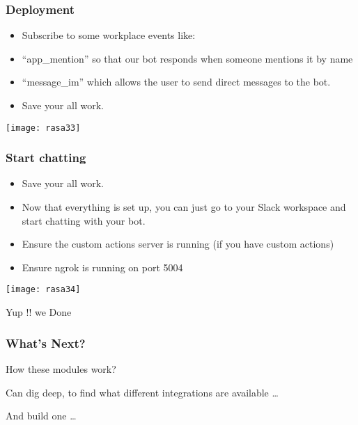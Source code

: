 \begin{frame}[fragile]\frametitle{Deployment}
\begin{itemize}
\item Subscribe to some workplace events like:
\item ``app\_mention'' so that our bot responds when someone mentions it by name
\item ``message\_im'' which allows the user to send direct messages to the bot.
\item Save your all work.
\end{itemize}

\begin{center}
\texttt{[image: rasa33]}
\end{center}
\end{frame}

\begin{frame}[fragile]\frametitle{Start chatting }
\begin{itemize}
\item Save your all work.
\item Now that everything is set up, you can just go to your Slack workspace and start chatting with your bot.
\item  Ensure the custom actions server is running (if you have custom actions)
\item Ensure ngrok is running on port 5004
\end{itemize}

\begin{center}
\texttt{[image: rasa34]}
\end{center}

Yup !! we Done
\end{frame}

\begin{frame}[fragile]\frametitle{What's Next?}
How these modules work? 

Can dig deep, to find what different integrations are available \ldots

And build one \ldots

\end{frame}
